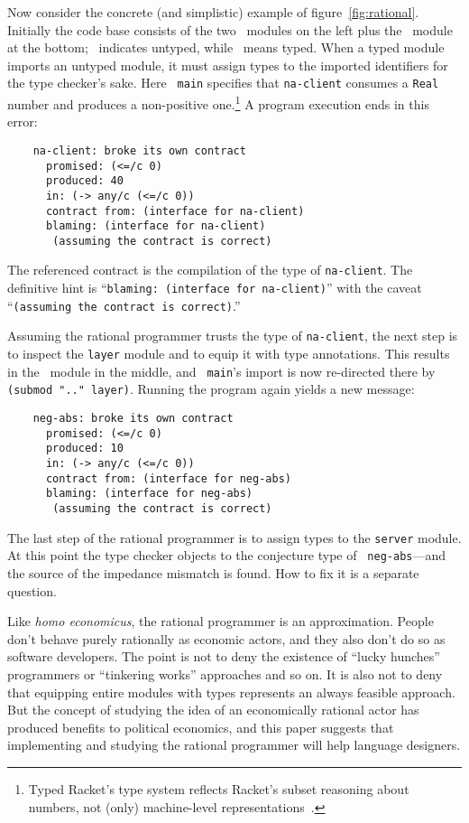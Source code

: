 Now consider the concrete (and simplistic) example of figure~\ref{fig:rational}.
Initially the code base consists of the two \dyncolor\ modules on the left plus
the \typecolor\ module at the bottom; \dyncolor\ indicates untyped, while
\typecolor\ means typed. When a typed module imports an untyped module, it must
assign types to the imported identifiers for the type checker's sake. Here {\tt
main} specifies that {\tt na-client} consumes a {\tt Real} number and produces a
non-positive one.\footnote{Typed Racket's type system reflects Racket's subset
reasoning about numbers, not (only) machine-level
representations~\cite{stathff-padl-12}.} A program execution ends in this error:
\begin{verbatim}
    na-client: broke its own contract
      promised: (<=/c 0)
      produced: 40
      in: (-> any/c (<=/c 0))           
      contract from: (interface for na-client)
      blaming: (interface for na-client)
       (assuming the contract is correct)
\end{verbatim}
The referenced contract is the compilation of the type of {\tt na-client}. The
definitive hint is ``{\tt blaming: (interface for na-client)}'' with the caveat
``{\tt (assuming the contract is correct)}.''

Assuming the rational programmer trusts the type of {\tt na-client}, the next
step is to inspect the {\tt layer} module and to equip it with type
annotations. This results in the \typecolor\ module in the middle, and {\tt
main}'s import is now re-directed there by {\tt (submod ".." layer)}. Running the
program again yields a new message:
\begin{verbatim}
    neg-abs: broke its own contract
      promised: (<=/c 0)
      produced: 10
      in: (-> any/c (<=/c 0))
      contract from: (interface for neg-abs)
      blaming: (interface for neg-abs)
       (assuming the contract is correct)
\end{verbatim}
The last step of the rational programmer is to assign types to the {\tt server}
module. At this point the type checker objects to the conjecture type of {\tt
neg-abs}---and the source of the impedance mismatch is found. How to fix it is a
separate question.

Like {\it homo economicus\/}, the rational programmer is an
approximation.  People don't behave purely rationally as economic
actors, and they also don't do so as software developers. The point is
not to deny the existence of ``lucky hunches'' programmers or
``tinkering works'' approaches and so on. It is also not to deny that
equipping entire modules with types represents an always feasible
approach.  But the concept of studying the idea of an economically
rational actor has produced benefits to political economics, and this
paper suggests that implementing and studying the rational programmer
will help language designers.
